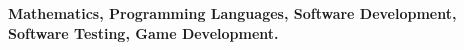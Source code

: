 
\textbf{\small Mathematics, Programming Languages, Software Development, Software Testing, Game Development.}
